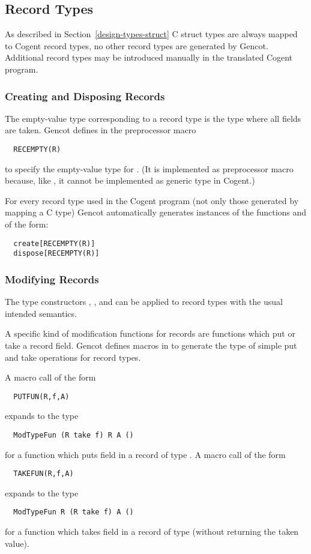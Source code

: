 \subsection{Record Types}
\label{design-operations-record}

As described in Section~\ref{design-types-struct} C struct types are always mapped to Cogent record types, no other record types are generated by Gencot. 
Additional record types may be introduced manually in the translated Cogent program.

\subsubsection{Creating and Disposing Records}

The empty-value type corresponding to a record type  is the type  where all fields are taken.
Gencot defines in  the preprocessor macro 
\begin{verbatim}
  RECEMPTY(R)
\end{verbatim}
to specify the empty-value type for . (It is implemented 
as preprocessor macro because, like , it cannot be implemented as generic type in Cogent.)

For every record type  used in the Cogent program (not only those generated by mapping a C type) Gencot automatically
generates instances of the functions  and  of the form:
\begin{verbatim}
  create[RECEMPTY(R)]
  dispose[RECEMPTY(R)]
\end{verbatim}

\subsubsection{Modifying Records}

The type constructors , , and  can be applied to record types with the 
usual intended semantics. 

A specific kind of modification functions for records are functions which put or take a record field. 
Gencot defines macros in  to generate the type of simple put and take operations for
record types.

A macro call of the form 
\begin{verbatim}
  PUTFUN(R,f,A)
\end{verbatim}
expands to the type
\begin{verbatim}
  ModTypeFun (R take f) R A ()
\end{verbatim}
for a function which puts field  in a record of type . A macro call of the form
\begin{verbatim}
  TAKEFUN(R,f,A)
\end{verbatim}
expands to the type
\begin{verbatim}
  ModTypeFun R (R take f) A ()
\end{verbatim}
for a function which takes field  in a record of type  (without returning the taken value).

